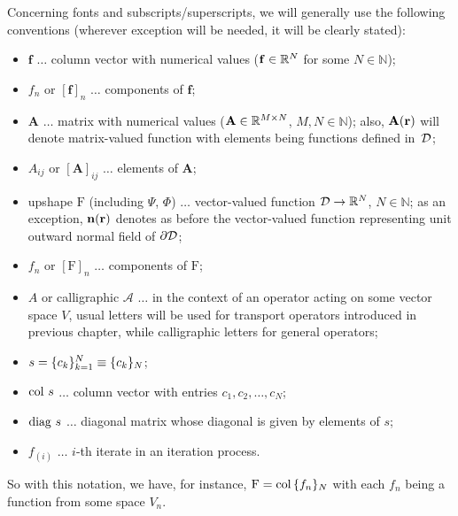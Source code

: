 Concerning fonts and subscripts/superscripts, we will generally use the following conventions (wherever exception will
be needed, it will be clearly stated):
\begin{itemize}
  \item $\mathbf{f}$ $\ldots$ column vector with numerical values ($\mathbf{f}\in\R[N]$ for some $N\in\mathbb{N}$);
  \item $f_n$ or $[\mathbf{f}]_n$ $\ldots$ components of $\mathbf{f}$;
  \item $\mathbf{A}$ $\ldots$ matrix with numerical values ($\mathbf{A}\in\R[M\times N]$, $M,N\in\mathbb{N}$);
  also, $\mathbf{A}(\br)$ will denote matrix-valued function with elements being functions defined in~$\VV$;
  \item $A_{ij}$ or $[\mathbf{A}]_{ij}$ $\ldots$ elements of $\mathbf{A}$;
  \item upshape $\mathrm{F}$ (including $\Psi$, $\Phi$) $\ldots$ vector-valued function $\VV\to\R[N]$,
  $N\in\mathbb{N}$; as an exception, $\bn(\br)$ denotes as before the vector-valued function representing unit outward
  normal field of $\pV$;
  \item $f_n$ or $[\mathrm{F}]_n$ $\ldots$ components of $\mathrm{F}$;
  \item $A$ or calligraphic $\mathcal{A}$ $\ldots$ in the context of an operator acting on some vector space $V$, usual
  letters will be used for transport operators introduced in previous chapter, while calligraphic letters for general  
  operators;
  \item $s = \{c_k\}_{k=1}^N \equiv \{c_k\}_\idxset{N}$;
  \item $\col s$ $\ldots$ column vector with entries $c_1,c_2,\ldots,c_N$;
  \item $\diag s$ $\ldots$ diagonal matrix whose diagonal is given by elements of $s$;
  \item $f_{(i)}$ $\ldots$ $i$-th iterate in an iteration process.
\end{itemize}
So with this notation, we have, for instance, $\mathrm{F} = \col \{f_n\}_N$ with each $f_n$ being a function from some
space $V_n$.
\mbox{}\\


